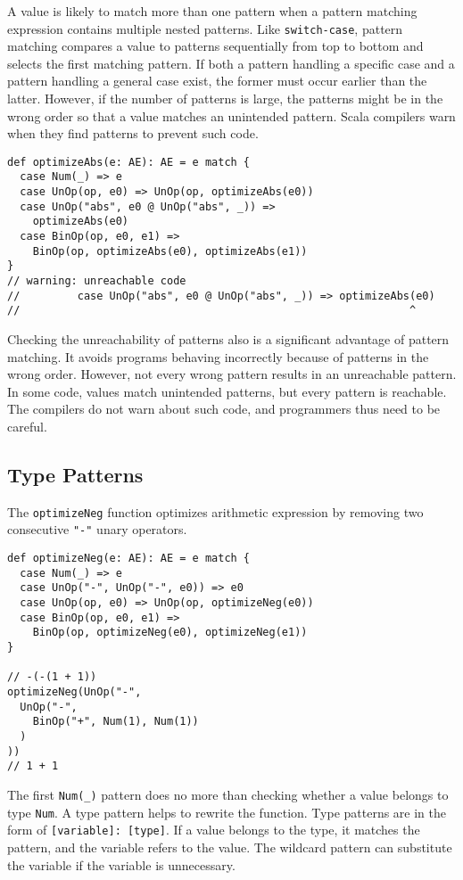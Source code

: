 A value is likely to match more than one pattern when a pattern matching
expression contains multiple nested patterns. Like \verb!switch-case!, pattern
matching compares a value to patterns sequentially from top to bottom and selects
the first matching pattern. If both a pattern handling a specific case and a
pattern handling a general case exist, the former must occur earlier than the
latter. However, if the number of patterns is large, the patterns might be in the
wrong order so that a value matches an unintended pattern. Scala compilers warn
when they find  patterns to prevent such code.

\begin{verbatim}
def optimizeAbs(e: AE): AE = e match {
  case Num(_) => e
  case UnOp(op, e0) => UnOp(op, optimizeAbs(e0))
  case UnOp("abs", e0 @ UnOp("abs", _)) =>
    optimizeAbs(e0)
  case BinOp(op, e0, e1) =>
    BinOp(op, optimizeAbs(e0), optimizeAbs(e1))
}
// warning: unreachable code
//         case UnOp("abs", e0 @ UnOp("abs", _)) => optimizeAbs(e0)
//                                                             ^
\end{verbatim}

Checking the unreachability of patterns also is a significant advantage of
pattern matching. It avoids programs behaving incorrectly because of patterns in
the wrong order. However, not every wrong pattern results in an unreachable
pattern. In some code, values match unintended patterns, but every pattern is
reachable. The compilers do not warn about such code, and programmers thus need
to be careful.

\subsection{Type Patterns}

The \verb!optimizeNeg! function optimizes arithmetic expression by removing two
consecutive \verb!"-"! unary operators.

\begin{verbatim}
def optimizeNeg(e: AE): AE = e match {
  case Num(_) => e
  case UnOp("-", UnOp("-", e0)) => e0
  case UnOp(op, e0) => UnOp(op, optimizeNeg(e0))
  case BinOp(op, e0, e1) =>
    BinOp(op, optimizeNeg(e0), optimizeNeg(e1))
}

// -(-(1 + 1))
optimizeNeg(UnOp("-",
  UnOp("-",
    BinOp("+", Num(1), Num(1))
  )
))
// 1 + 1
\end{verbatim}

The first \verb!Num(_)! pattern does no more than checking whether a value
belongs to type \verb!Num!. A type pattern helps to rewrite the function. Type
patterns are in the form of \verb![variable]: [type]!. If a value belongs to the
type, it matches the pattern, and the variable refers to the value. The wildcard
pattern can substitute the variable if the variable is unnecessary.

